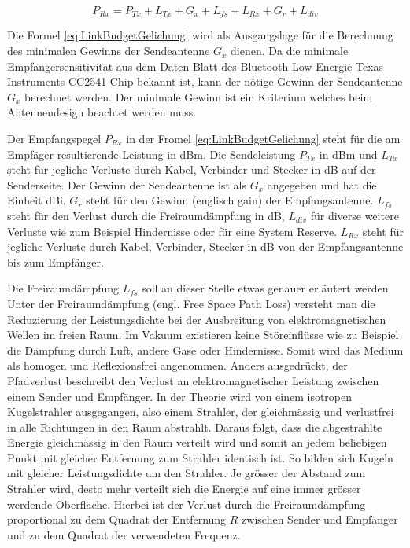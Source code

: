\begin{equation}
P_{Rx} = P_{Tx}+L_{Tx}+G_{x}+L_{fs}+L_{Rx}+G_{r}+L_{div}\label{eq:LinkBudgetGelichung}
\end{equation}

Die Formel \ref{eq:LinkBudgetGelichung} wird als Ausgangslage für die Berechnung des minimalen Gewinns der Sendeantenne $G_{x}$ dienen. Da  die minimale Empfängersensitivität aus dem Daten Blatt des  Bluetooth Low Energie Texas Instruments CC2541 Chip bekannt ist, kann der nötige Gewinn der Sendeantenne $G_{x}$ berechnet werden. Der minimale Gewinn ist ein Kriterium welches beim Antennendesign beachtet werden muss.

Der Empfangspegel $P_{Rx}$ in der Fromel \ref{eq:LinkBudgetGelichung}  steht für die am Empfäger resultierende Leistung in dBm.  Die Sendeleistung $P_{Tx}$ in dBm und $L_{Tx}$ steht für jegliche Verluste durch Kabel, Verbinder und Stecker in dB auf der Senderseite. Der Gewinn der Sendeantenne ist als $G_{x}$ angegeben und hat die Einheit dBi. $G_{r}$ steht für den Gewinn (englisch gain) der Empfangsantenne. $L_{fs}$ steht für den Verlust durch die Freiraumdämpfung in dB, $L_{div}$  für diverse weitere Verluste wie zum Beispiel Hindernisse oder für eine System Reserve.  $L_{Rx}$ steht für jegliche Verluste durch Kabel, Verbinder, Stecker in dB von der Empfangsantenne bis zum Empfänger.


Die Freiraumdämpfung $L_{fs}$ soll an dieser Stelle etwas genauer erläutert werden. Unter der Freiraumdämpfung (engl. Free Space Path Loss)  versteht man die Reduzierung der Leistungsdichte bei der Ausbreitung von elektromagnetischen Wellen im freien Raum. Im Vakuum existieren keine Störeinflüsse wie zu Beispiel die Dämpfung durch Luft, andere Gase oder  Hindernisse. Somit wird das Medium als homogen  und Reflexionsfrei angenommen. Anders ausgedrückt, der Pfadverlust beschreibt den Verlust an elektromagnetischer Leistung zwischen einem Sender und Empfänger.
In der Theorie wird von einem isotropen Kugelstrahler ausgegangen, also einem Strahler, der gleichmässig und verlustfrei in alle Richtungen in den Raum abstrahlt. Daraus folgt, dass die abgestrahlte Energie gleichmässig in den Raum verteilt wird und somit an jedem beliebigen Punkt mit gleicher Entfernung zum Strahler identisch ist. So bilden sich Kugeln mit gleicher Leistungsdichte um den Strahler. Je grösser der Abstand zum Strahler wird, desto mehr verteilt sich die Energie auf eine immer grösser werdende Oberfläche. Hierbei ist der Verlust durch die Freiraumdämpfung proportional zu dem Quadrat der Entfernung $R$ zwischen Sender und Empfänger und zu dem Quadrat der verwendeten Frequenz.
\cite{linkbudget}

